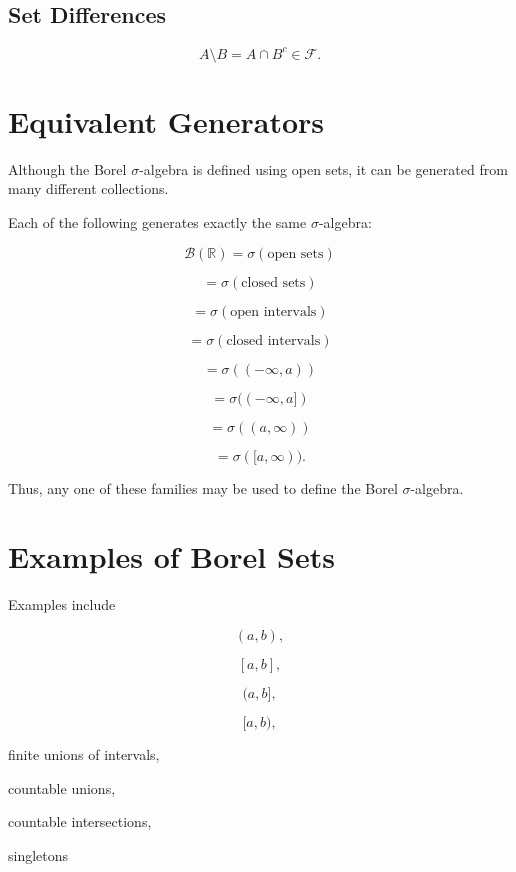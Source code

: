 \documentclass[11pt]{article}
\begin{document}
	\subsection*{Set Differences}
	
	\[
	\boxed{
		A\setminus B
		=
		A\cap B^c
		\in
		\mathcal F.
	}
	\]
	
	
	\section{Equivalent Generators}
	
	Although the Borel $\sigma$-algebra is defined using open sets, it can be
	generated from many different collections.
	
	Each of the following generates exactly the same $\sigma$-algebra:
	
	\[
	\boxed{
		\mathcal B(\mathbb R)
		=
		\sigma(\text{open sets})
	}
	\]
	
	\[
	=
	\sigma(\text{closed sets})
	\]
	
	\[
	=
	\sigma(\text{open intervals})
	\]
	
	\[
	=
	\sigma(\text{closed intervals})
	\]
	
	\[
	=
	\sigma((-\infty,a))
	\]
	
	\[
	=
	\sigma((-\infty,a])
	\]
	
	\[
	=
	\sigma((a,\infty))
	\]
	
	\[
	=
	\sigma([a,\infty)).
	\]
	
	Thus, any one of these families may be used to define the Borel
	$\sigma$-algebra.
	
	
	\section{Examples of Borel Sets}
	
	Examples include
	
	\[
	(a,b),
	\]
	
	\[
	[a,b],
	\]
	
	\[
	(a,b],
	\]
	
	\[
	[a,b),
	\]
	
	finite unions of intervals,
	
	countable unions,
	
	countable intersections,
	
	singletons
	
\end{document}

